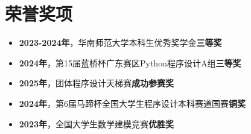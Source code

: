 \section{荣誉奖项}
\begin{normalsize}
  \begin{itemize}[parsep=0.5ex]
    \item \textbf{2023-2024年}，华南师范大学本科生优秀奖学金\textbf{三等奖}
    \item \textbf{2024年}，第15届蓝桥杯广东赛区Python程序设计A组\textbf{三等奖}
    \item \textbf{2025年}，团体程序设计天梯赛\textbf{成功参赛奖}
    \item \textbf{2024年}，第6届马蹄杯全国大学生程序设计本科赛道国赛\textbf{铜奖}
    \item \textbf{2023年}，全国大学生数学建模竞赛\textbf{优胜奖}
  \end{itemize}
\end{normalsize}